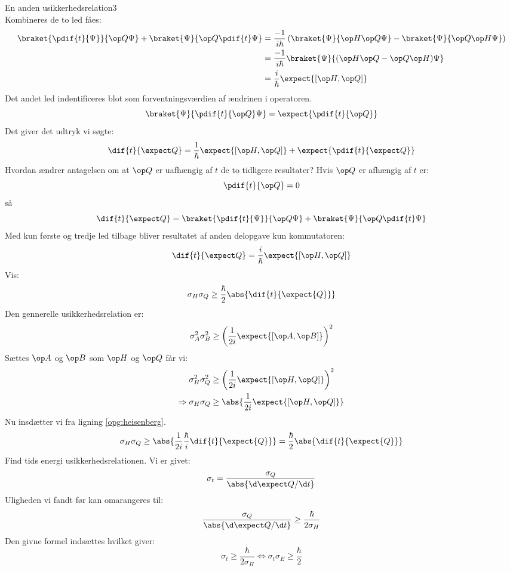 \begin{opgave}{En anden usikkerhedsrelation}{3}
$$$$
Kombineres de to led fåes:
\begin{align*}
\braket{\pdif{t}{\Psi}}{\op Q\Psi}+\braket{\Psi}{\op Q\pdif{t}\Psi} &= \frac{-1}{i\hbar}\left(\braket{\Psi}{\op H\op Q\Psi}-\braket{\Psi}{\op Q \op H \Psi}\right)\\
&= \frac{-1}{i\hbar}\braket{\Psi}{(\op H\op Q-\op Q\op H)\Psi}\\
&= \frac{i}{\hbar}\expect{[\op H,\op Q]}
\end{align*}
Det andet led indentificeres blot som forventningsværdien af ændrinen i operatoren.
$$
\braket{\Psi}{\pdif{t}{\op Q}\Psi} = \expect{\pdif{t}{\op Q}}
$$
Det giver det udtryk vi søgte:
$$
\dif{t}{\expect Q} = \frac{1}{\hbar}\expect{[\op H,\op Q]}+\expect{\pdif{t}{\expect Q}}
$$
\opg Hvordan ændrer antagelsen om at $\op Q$ er uafhængig af $t$ de to tidligere resultater?
Hvis $\op Q$ er afhængig af $t$ er:
$$
\pdif{t}{\op Q} = 0
$$
så
$$
\dif{t}{\expect Q} = \braket{\pdif{t}{\Psi}}{\op Q\Psi}+\braket{\Psi}{\op Q \pdif{t} \Psi}
$$
Med kun første og tredje led tilbage bliver resultatet af anden delopgave kun kommutatoren:
\begin{equation}
\label{opg:heisenberg}
\dif{t}{\expect Q} = \frac{i}{\hbar}\expect{[\op H,\op Q]}
\end{equation}
\opg Vis:
$$
\sigma_H\sigma_Q \geq \frac{\hbar}{2}\abs{\dif{t}{\expect{Q}}}
$$
Den gennerelle usikkerhedsrelation er:
$$
\sigma_A^2\sigma_B^2\geq \left(\frac{1}{2i}\expect{[\op A,\op B]}\right)^2
$$
Sættes $\op A$ og $\op B$ som $\op H$ og $\op Q$ får vi:
\begin{align*}
\sigma_H^2\sigma_Q^2&\geq \left(\frac{1}{2i}\expect{[\op H,\op Q]}\right)^2\\\Rightarrow
\sigma_H\sigma_Q &\geq \abs{\frac{1}{2i}\expect{[\op H,\op Q]}}
\end{align*}
Nu insdætter vi fra ligning \eqref{opg:heisenberg}.
$$
\sigma_H\sigma_Q \geq \abs{\frac{1}{2i}\frac{\hbar}{i}\dif{t}{\expect{Q}}}= \frac{\hbar}{2}\abs{\dif{t}{\expect{Q}}}
$$
\opg Find tids energi usikkerhedsrelationen.
Vi er givet:
$$
\sigma_t = \frac{\sigma_Q}{\abs{\d\expect Q/\d t}}
$$
Uligheden vi fandt før kan omarangeres til:
$$
\frac{\sigma_Q}{\abs{\d \expect Q/\d t}} \geq \frac{\hbar}{2 \sigma_H}
$$
Den givne formel indsættes hvilket giver:
$$
\sigma_t \geq \frac{\hbar}{2 \sigma_H}\iff \sigma_t\sigma_E \geq \frac{\hbar}{2}
$$
\end{opgave}